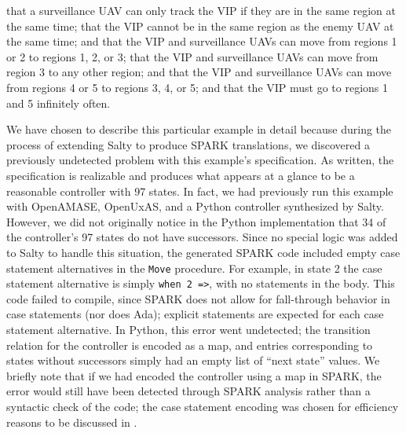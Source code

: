 \documentclass[runningheads]{llncs}
\begin{document}
 that a surveillance UAV can only track the VIP if they are in the same region at the same time; 
 that the VIP cannot be in the same region as the enemy UAV at the same time; 
 and  that the VIP and surveillance UAVs can move from regions 1 or 2 to regions 1, 2, or 3;
 that the VIP and surveillance UAVs can move from region 3 to any other region; 
 and  that the VIP and surveillance UAVs can move from regions 4 or 5 to regions 3, 4, or 5; 
and  that the VIP must go to regions 1 and 5 infinitely often.

We have chosen to describe this particular example in detail because during the process of extending Salty to produce SPARK translations, 
we discovered a previously undetected problem with this example's specification. 
As written, the specification is realizable and produces what appears at a glance to be a reasonable controller with 97 states. 
In fact, we had previously run this example with OpenAMASE, OpenUxAS, and a Python controller synthesized by Salty. 
However, we did not originally notice in the Python implementation that 34 of the controller's 97 states do not have successors. 
Since no special logic was added to Salty to handle this situation, the generated SPARK code included empty case statement alternatives in the \lstinline{Move} procedure. 
For example, in state 2 the case statement alternative is simply \lstinline{when 2 =>}, with no statements in the body. 
This code failed to compile, since SPARK does not allow for fall-through behavior in case statements (nor does Ada); 
explicit statements are expected for each case statement alternative. 
In Python, this error went undetected; 
the transition relation for the controller is encoded as a map, and entries corresponding to states without successors 
simply had an empty list of ``next state'' values. 
We briefly note that if we had encoded the controller using a map in SPARK, 
the error would still have been detected through SPARK analysis rather than a syntactic check of the code; 
the case statement encoding was chosen for efficiency reasons to be discussed in .
\end{document}
